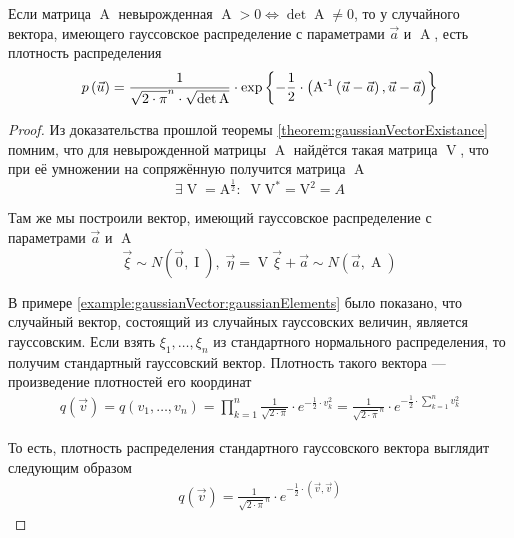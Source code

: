 \begin{theorem}
  \label{theorem:gaussianVector:dencity}
  Если матрица $\operatorname{A}$ невырожденная
  $\operatorname{A} > 0 \Leftrightarrow \det{\operatorname{A}} \neq 0$,
  то у случайного вектора, имеющего гауссовское распределение с параметрами
  $\vec{a}$ и $\operatorname{A}$, есть плотность распределения
  $$p\left(\vec{u}\right)
      = \frac{1}{\sqrt{2 \cdot \pi}^n \cdot \sqrt{\det{\operatorname{A}}}}
      \cdot \exp{\left\{ -\frac{1}{2} \cdot \left(
          \operatorname{A^{-1}} \left( \vec{u} - \vec{a} \right),
          \vec{u} - \vec{a} \right) \right\}}$$
\end{theorem}
\begin{proof}
  Из доказательства прошлой теоремы \ref{theorem:gaussianVectorExistance}
  помним, что для невырожденной матрицы $\operatorname{A}$ найдётся такая
  матрица $\operatorname{V}$, что при её умножении на сопряжённую получится
  матрица $\operatorname{A}$
  $$\exists \operatorname{V} = \operatorname{A^{\frac{1}{2}}}:\;
      \operatorname{V}\operatorname{V^*} = \operatorname{V^2} = A$$

  Там же мы построили вектор, имеющий гауссовское распределение с параметрами
  $\vec{a}$ и $\operatorname{A}$
  $$\vec{\xi} \sim N\left( \vec{0}, \operatorname{I} \right),\;
      \vec{\eta} = \operatorname{V} \vec{\xi} + \vec{a}
      \sim N\left( \vec{a}, \operatorname{A} \right)$$

  В примере \ref{example:gaussianVector:gaussianElements} было показано, что
  случайный вектор, состоящий из случайных гауссовских величин, является
  гауссовским. Если взять $\xi_1, \dots, \xi_n$ из стандартного нормального
  распределения, то получим стандартный гауссовский вектор. Плотность такого
  вектора --- произведение плотностей его координат
  \begin{align*}
      q\left( \vec{v} \right)
      = q\left( v_1, \dots, v_n \right)
      = \prod_{k=1}^n \frac{1}{\sqrt{2 \cdot \pi}}
      \cdot e^{-\frac{1}{2} \cdot v_k^2}
      = \frac{1}{\sqrt{2 \cdot \pi}^n}
      \cdot e^{-\frac{1}{2} \cdot \sum_{k=1}^n v_k^2}
  \end{align*}

  То есть, плотность распределения стандартного гауссовского вектора выглядит
  следующим образом
  \begin{align*}
      q\left( \vec{v} \right)
      = \frac{1}{\sqrt{2 \cdot \pi}^n}
      \cdot e^{-\frac{1}{2} \cdot \left( \vec{v}, \vec{v} \right)}
  \end{align*}


\end{proof}
